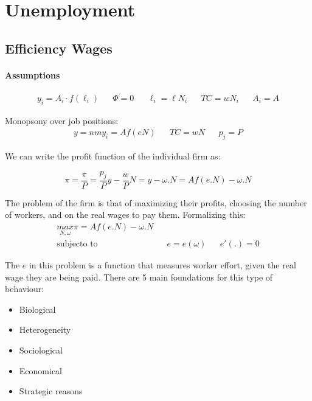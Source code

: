 \section{Unemployment}
\subsection{Efficiency Wages}

\paragraph{Assumptions}
\begin{align*}
y _ { i} = A _ { i } \cdot f \left( \ell _ { i } \right)
&&
\Phi = 0
&&
\ell _ { i } = \ell N _ { i }
&&
TC  = wN_i 
&&
A_i = A
\end{align*}

Monopsony over job positions:
\begin{align*}
y = nm y_i = A f(eN)
&&
TC = wN
&&
p_j = P
\end{align*}

We can write the profit function of the individual firm as:

\begin{equation*}
    \pi=\frac{\pi}{P}=\frac{p_{j}}{P}y-\frac{w}{P}N=y-\omega.N=Af(e.N)-\omega.N
\end{equation*}

The problem of the firm is that of maximizing their profits, choosing the number of workers, and on the real wages to pay them. Formalizing this: 
\begin{equation*}
\begin{aligned}
    \underset{N,\omega}{max} \pi=Af(e.N)-\omega.N \\
   \text{subjecto to} && e=e(\omega) && e'(.)=0
\end{aligned}
\end{equation*}

The $e$ in this problem is a function that measures worker effort, given the real wage they are being paid. There are 5 main foundations for this type of behaviour: 
\begin{itemize}
    \item Biological
    \item Heterogeneity
    \item Sociological
    \item Economical 
    \item Strategic reasons
\end{itemize}

